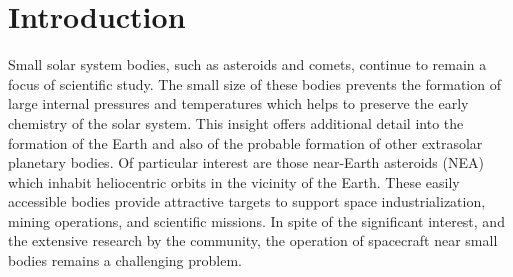 \documentclass[smallextended]{svjour3}       %
\begin{document}




\section{Introduction}
Small solar system bodies, such as asteroids and comets, continue to remain a focus of scientific study.
The small size of these bodies prevents the formation of large internal pressures and temperatures which helps to preserve the early chemistry of the solar system.
This insight offers additional detail into the formation of the Earth and also of the probable formation of other extrasolar planetary bodies.
Of particular interest are those near-Earth asteroids (NEA) which inhabit heliocentric orbits in the vicinity of the Earth. 
These easily accessible bodies provide attractive targets to support space industrialization, mining operations, and scientific missions.
In spite of the significant interest, and the extensive research by the community, the operation of spacecraft near small bodies remains a challenging problem.
\end{document}
